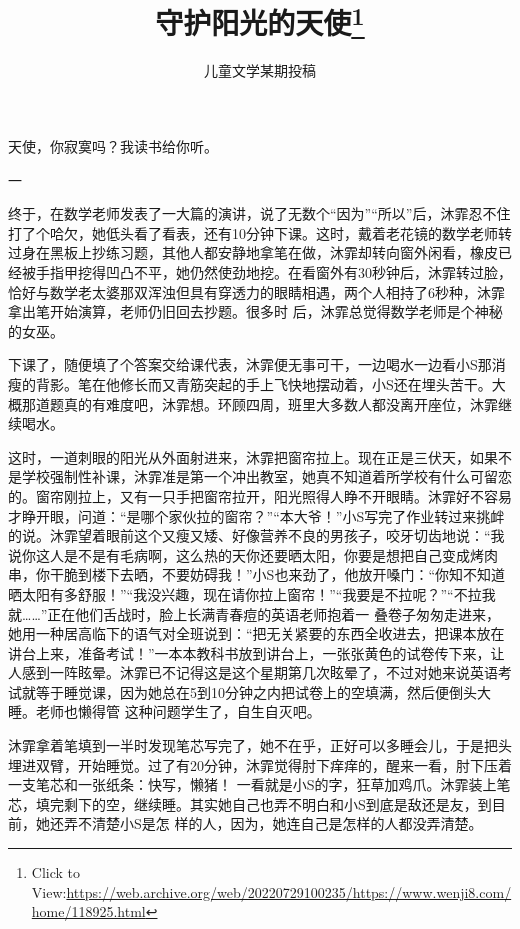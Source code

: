 \documentclass{article}
\title{守护阳光的天使\footnote{Click to View:\url{https://web.archive.org/web/20220729100235/https://www.wenji8.com/home/118925.html}}}
\author{儿童文学某期投稿}
\date{}
\begin{document}

\maketitle


\Large


﻿天使，你寂寞吗？我读书给你听。 


一 

终于，在数学老师发表了一大篇的演讲，说了无数个“因为”“所以”后，沐霏忍不住打了个哈欠，她低头看了看表，还有10分钟下课。这时，戴着老花镜的数学老师转过身在黑板上抄练习题，其他人都安静地拿笔在做，沐霏却转向窗外闲看，橡皮已经被手指甲挖得凹凸不平，她仍然使劲地挖。在看窗外有30秒钟后，沐霏转过脸，恰好与数学老太婆那双浑浊但具有穿透力的眼睛相遇，两个人相持了6秒种，沐霏拿出笔开始演算，老师仍旧回去抄题。很多时
后，沐霏总觉得数学老师是个神秘的女巫。 

\newpage

下课了，随便填了个答案交给课代表，沐霏便无事可干，一边喝水一边看小S那消瘦的背影。笔在他修长而又青筋突起的手上飞快地摆动着，小S还在埋头苦干。大概那道题真的有难度吧，沐霏想。环顾四周，班里大多数人都没离开座位，沐霏继续喝水。
 

这时，一道刺眼的阳光从外面射进来，沐霏把窗帘拉上。现在正是三伏天，如果不是学校强制性补课，沐霏准是第一个冲出教室，她真不知道着所学校有什么可留恋的。窗帘刚拉上，又有一只手把窗帘拉开，阳光照得人睁不开眼睛。沐霏好不容易才睁开眼，问道：“是哪个家伙拉的窗帘？”“本大爷！”小S写完了作业转过来挑衅的说。沐霏望着眼前这个又瘦又矮、好像营养不良的男孩子，咬牙切齿地说：“我说你这人是不是有毛病啊，这么热的天你还要晒太阳，你要是想把自己变成烤肉串，你干脆到楼下去晒，不要妨碍我！”小S也来劲了，他放开嗓门：“你知不知道晒太阳有多舒服！”“我没兴趣，现在请你拉上窗帘！”“我要是不拉呢？”“不拉我就……”正在他们舌战时，脸上长满青春痘的英语老师抱着一
\newpage
叠卷子匆匆走进来，她用一种居高临下的语气对全班说到：“把无关紧要的东西全收进去，把课本放在讲台上来，准备考试！”一本本教科书放到讲台上，一张张黄色的试卷传下来，让人感到一阵眩晕。沐霏已不记得这是这个星期第几次眩晕了，不过对她来说英语考试就等于睡觉课，因为她总在5到10分钟之内把试卷上的空填满，然后便倒头大睡。老师也懒得管
这种问题学生了，自生自灭吧。 

沐霏拿着笔填到一半时发现笔芯写完了，她不在乎，正好可以多睡会儿，于是把头埋进双臂，开始睡觉。过了有20分钟，沐霏觉得肘下痒痒的，醒来一看，肘下压着一支笔芯和一张纸条：快写，懒猪！ 一看就是小S的字，狂草加鸡爪。沐霏装上笔芯，填完剩下的空，继续睡。其实她自己也弄不明白和小S到底是敌还是友，到目前，她还弄不清楚小S是怎
样的人，因为，她连自己是怎样的人都没弄清楚。 
\end{document}
